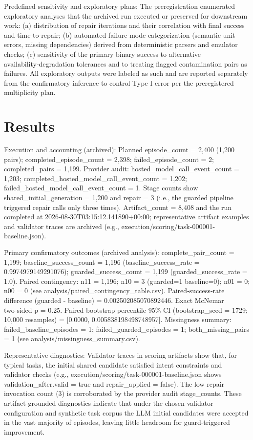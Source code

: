 \documentclass[conference]{IEEEtran}
\begin{document}
Predefined sensitivity and exploratory plans: The preregistration enumerated exploratory analyses that the archived run executed or preserved for downstream work: (a) distribution of repair iterations and their correlation with final success and time‑to‑repair; (b) automated failure‑mode categorization (semantic unit errors, missing dependencies) derived from deterministic parsers and emulator checks; (c) sensitivity of the primary binary success to alternative availability‑degradation tolerances and to treating flagged contamination pairs as failures. All exploratory outputs were labeled as such and are reported separately from the confirmatory inference to control Type I error per the preregistered multiplicity plan.

\section{Results}
Execution and accounting (archived): Planned episode\_count = 2,400 (1,200 pairs); completed\_episode\_count = 2,398; failed\_episode\_count = 2; completed\_pairs = 1,199. Provider audit: hosted\_model\_call\_event\_count = 1,203; completed\_hosted\_model\_call\_event\_count = 1,202; failed\_hosted\_model\_call\_event\_count = 1. Stage counts show shared\_initial\_generation = 1,200 and repair = 3 (i.e., the guarded pipeline triggered repair calls only three times). Artifact\_count = 8,408 and the run completed at 2026‑08‑30T03:15:12.141890+00:00; representative artifact examples and validator traces are archived (e.g., execution/scoring/task-000001-baseline.json).

Primary confirmatory outcomes (archived analysis): complete\_pair\_count = 1,199; baseline\_success\_count = 1,196 (baseline\_success\_rate = 0.9974979149291076); guarded\_success\_count = 1,199 (guarded\_success\_rate = 1.0). Paired contingency: n11 = 1,196; n10 = 3 (guarded=1 baseline=0); n01 = 0; n00 = 0 (see analysis/paired\_contingency\_table.csv). Paired‑success‑rate difference (guarded - baseline) = 0.002502085070892446. Exact McNemar two‑sided p = 0.25. Paired bootstrap percentile 95\% CI (bootstrap\_seed = 1729; 10,000 resamples) = [0.0000, 0.005838198498748957]. Missingness summary: failed\_baseline\_episodes = 1; failed\_guarded\_episodes = 1; both\_missing\_pairs = 1 (see analysis/missingness\_summary.csv).

Representative diagnostics: Validator traces in scoring artifacts show that, for typical tasks, the initial shared candidate satisfied intent constraints and validator checks (e.g., execution/scoring/task-000001-baseline.json shows validation\_after.valid = true and repair\_applied = false). The low repair invocation count (3) is corroborated by the provider audit stage\_counts. These artifact‑grounded diagnostics indicate that under the chosen validator configuration and synthetic task corpus the LLM initial candidates were accepted in the vast majority of episodes, leaving little headroom for guard‑triggered improvement.
\end{document}
